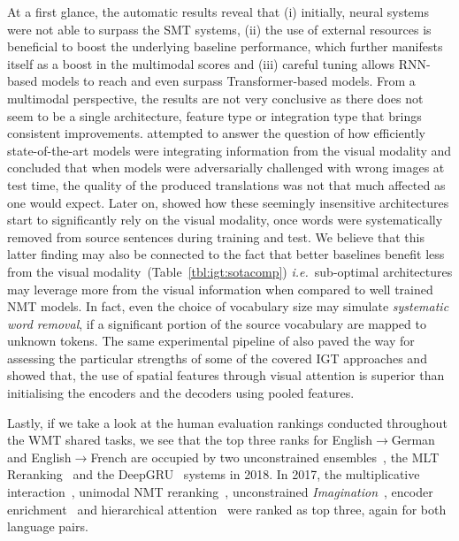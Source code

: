 \documentclass{svjour3}
\newcommand{\ie}[1]{\textit{i.e.}~#1}
\newcommand{\lp}[2]{#1$\rightarrow$#2}
\begin{document}
At a first glance, the automatic results reveal that (i) initially, neural systems were not able to surpass the SMT systems, (ii) the use of external resources is beneficial to boost the underlying baseline performance, which further manifests itself as a boost in the multimodal scores and (iii) careful tuning allows RNN-based models to reach and even surpass Transformer-based models.
From a multimodal perspective, the results are not very conclusive as there does not seem to be a single architecture, feature type or integration type that brings consistent improvements.
\cite{elliott2018adversarial} attempted to answer the question of how efficiently state-of-the-art models were integrating information from the visual modality and concluded that when models were adversarially challenged with wrong images at test time, the quality of the produced translations was not that much affected as one would expect. Later on, \cite{caglayan-probing-2019} showed how these seemingly insensitive architectures start to significantly rely on the visual modality, once words were systematically removed from source sentences during training and test. We believe that this latter finding may also be connected to the fact that better baselines benefit less from the visual modality~(Table~\ref{tbl:igt:sotacomp}) \ie sub-optimal architectures may leverage more from the visual information when compared to well trained NMT models. In fact, even the choice of vocabulary size may simulate \textit{systematic word removal}, if a significant portion of the source vocabulary are mapped to unknown tokens.
The same experimental pipeline of \cite{caglayan-probing-2019} also paved the way for assessing the particular strengths of some of the covered IGT approaches and showed that, the use of spatial features through visual attention is superior than initialising the encoders and the decoders using pooled features.

Lastly, if we take a look at the human evaluation rankings conducted throughout the WMT shared tasks, we see that the top three ranks for \lp{English}{German} and \lp{English}{French} are occupied by two unconstrained ensembles~\citep{gronroos-memad-2018,helcl-libovick-varis:2018:WMT}, the MLT Reranking~\citep{lala-EtAl:2018:WMT} and the DeepGRU~\citep{delbrouck-dupont:2018:WMT} systems in 2018. In 2017, the multiplicative interaction~\citep{caglayan-lium-cvc-2017}, unimodal NMT reranking~\citep{zhang-EtAl:2017:WMT2}, unconstrained \textit{Imagination}~\citep{elliott-imagination-2017}, encoder enrichment~\citep{calixto-incorporating-2017} and hierarchical attention~\citep{helcl-libovicky:2017:WMT} were ranked as top three, again for both language pairs.
\end{document}
